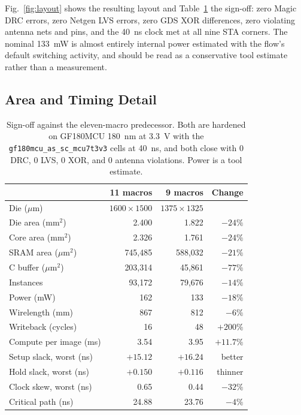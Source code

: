 \documentclass[conference,a4paper]{APSIPA2026}
\begin{document}
Fig.~\ref{fig:layout} shows the resulting layout and Table~\ref{tab:vs11} the sign-off: zero Magic DRC errors, zero Netgen LVS errors, zero GDS XOR differences, zero violating antenna nets and pins, and the 40~ns clock met at all nine STA corners. The nominal 133~mW is almost entirely internal power estimated with the flow's default switching activity, and should be read as a conservative tool estimate rather than a measurement.

\subsection{Area and Timing Detail}\label{sec:areatiming}

\begin{table}[!ht]
\caption{Sign-off against the eleven-macro predecessor. Both are hardened on GF180MCU 180~nm at 3.3~V with the \texttt{gf180mcu\_as\_sc\_mcu7t3v3} cells at 40~ns, and both close with 0 DRC, 0 LVS, 0 XOR, and 0 antenna violations. Power is a tool estimate.}
\label{tab:vs11}
\centering
\renewcommand{\arraystretch}{1.0}
\begin{tabular}{@{}lrrr@{}}
\toprule
 & 11 macros & 9 macros & Change \\
\midrule
Die ($\mu$m)           & $1600{\times}1500$ & $1375{\times}1325$ & \\
Die area (mm$^2$)      & 2.400   & 1.822   & $-24\%$ \\
Core area (mm$^2$)     & 2.326   & 1.761   & $-24\%$ \\
SRAM area ($\mu$m$^2$) & 745,485 & 588,032 & $-21\%$ \\
C buffer ($\mu$m$^2$)  & 203,314 & 45,861  & $-77\%$ \\
Instances              & 93,172  & 79,676  & $-14\%$ \\
Power (mW)             & 162     & 133     & $-18\%$ \\
Wirelength (mm)        & 867     & 812     & $-6\%$ \\
Writeback (cycles)     & 16      & 48      & $+200\%$ \\
Compute per image (ms) & 3.54    & 3.95    & $+11.7\%$ \\
Setup slack, worst (ns) & $+15.12$ & $+16.24$ & better \\
Hold slack, worst (ns)  & $+0.150$ & $+0.116$ & thinner \\
Clock skew, worst (ns)  & 0.65    & 0.44    & $-32\%$ \\
Critical path (ns)      & 24.88   & 23.76   & $-4\%$ \\
\bottomrule
\end{tabular}
\end{table}
\end{document}

